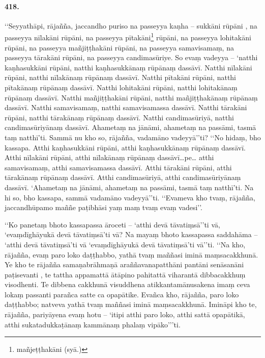 \paragraph{418.} ‘‘Seyyathāpi, rājañña, jaccandho puriso na passeyya kaṇha – sukkāni rūpāni , na passeyya nīlakāni rūpāni, na passeyya pītakāni\footnote{mañjeṭṭhakāni (syā.)} rūpāni, na passeyya lohitakāni rūpāni, na passeyya mañjiṭṭhakāni rūpāni, na passeyya samavisamaṃ, na passeyya tārakāni rūpāni, na passeyya candimasūriye. So evaṃ vadeyya – ‘natthi kaṇhasukkāni rūpāni, natthi kaṇhasukkānaṃ rūpānaṃ dassāvī. Natthi nīlakāni rūpāni, natthi nīlakānaṃ rūpānaṃ dassāvī. Natthi pītakāni rūpāni, natthi pītakānaṃ rūpānaṃ dassāvī. Natthi lohitakāni rūpāni, natthi lohitakānaṃ rūpānaṃ dassāvī. Natthi mañjiṭṭhakāni rūpāni, natthi mañjiṭṭhakānaṃ rūpānaṃ dassāvī. Natthi samavisamaṃ, natthi samavisamassa dassāvī. Natthi tārakāni rūpāni, natthi tārakānaṃ rūpānaṃ dassāvī. Natthi candimasūriyā, natthi candimasūriyānaṃ dassāvī. Ahametaṃ na jānāmi, ahametaṃ na passāmi, tasmā taṃ natthī’ti. Sammā nu kho so, rājañña, vadamāno vadeyyā’’ti? ‘‘No hidaṃ, bho kassapa. Atthi kaṇhasukkāni rūpāni, atthi kaṇhasukkānaṃ rūpānaṃ dassāvī. Atthi nīlakāni rūpāni, atthi nīlakānaṃ rūpānaṃ dassāvī…pe… atthi samavisamaṃ, atthi samavisamassa dassāvī. Atthi tārakāni rūpāni, atthi tārakānaṃ rūpānaṃ dassāvī. Atthi candimasūriyā, atthi candimasūriyānaṃ dassāvī. ‘Ahametaṃ na jānāmi, ahametaṃ na passāmi, tasmā taṃ natthī’ti. Na hi so, bho kassapa, sammā vadamāno vadeyyā’’ti. ‘‘Evameva kho tvaṃ, rājañña, jaccandhūpamo maññe paṭibhāsi yaṃ maṃ tvaṃ evaṃ vadesi’’.

‘‘Ko panetaṃ bhoto kassapassa āroceti – ‘atthi devā tāvatiṃsā’’ti vā, ‘evaṃdīghāyukā devā tāvatiṃsā’ti vā? Na mayaṃ bhoto kassapassa saddahāma – ‘atthi devā tāvatiṃsā’ti vā ‘evaṃdīghāyukā devā tāvatiṃsā’ti vā’’ti. ‘‘Na kho, rājañña, evaṃ paro loko daṭṭhabbo, yathā tvaṃ maññasi iminā maṃsacakkhunā. Ye kho te rājañña samaṇabrāhmaṇā araññavanapatthāni pantāni senāsanāni paṭisevanti , te tattha appamattā ātāpino pahitattā viharantā dibbacakkhuṃ visodhenti. Te dibbena cakkhunā visuddhena atikkantamānusakena imaṃ ceva lokaṃ passanti parañca satte ca opapātike. Evañca kho, rājañña, paro loko daṭṭhabbo; natveva yathā tvaṃ maññasi iminā maṃsacakkhunā. Imināpi kho te, rājañña, pariyāyena evaṃ hotu – ‘itipi atthi paro loko, atthi sattā opapātikā, atthi sukatadukkaṭānaṃ kammānaṃ phalaṃ vipāko’’’ti.

